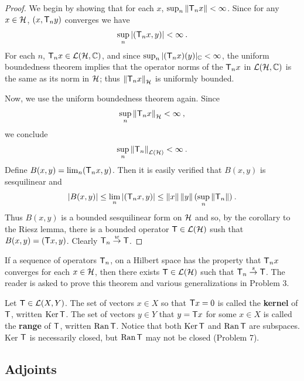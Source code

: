 \begin{proof}
    We begin by showing that for each $x$, $\sup_n \left \Vert \mathsf{T}_n x \right \Vert < \infty$. Since for any $x \in \mathcal{H}$, $(x, \mathsf{T}_n y)$ converges we have \begin{align}
        \sup_n |(\mathsf{T}_n x, y)| < \infty \:.
    \end{align}
    For each $n$, $\mathsf{T}_n x \in \mathcal L(\mathcal{H}, \mathbb{C})$, and since $\sup_n |(\mathsf{T}_n x)(y)|_{\mathbb{C}} < \infty$, the uniform boundedness theorem implies that the operator norms of the $\mathsf{T}_nx$ in $\mathcal L(\mathcal{H}, \mathbb{C})$ is the same as its norm in $\mathcal{H}$; thus $\left \Vert \mathsf{T}_n x \right \Vert_{\mathcal{H}}$ is uniformly bounded.

    Now, we use the uniform boundedness theorem again. Since \begin{align}
        \sup_n \left \Vert \mathsf{T}_n x \right \Vert_{\mathcal{H}} < \infty \:,
    \end{align}
    we conclude \begin{align}
        \sup_n \left \Vert \mathsf{T}_n \right \Vert_{\mathcal L(\mathcal{H})} < \infty \:.
    \end{align}
    Define $B(x,y) = \lim_n (\mathsf{T}_n x, y)$. Then it is easily verified that $B(x,y)$ is sesquilinear and \begin{align}
        |B(x,y)| \leq \lim_n |(\mathsf{T}_n x,y)| \leq \left \Vert x \right \Vert \left \Vert y \right \Vert (\sup_n \left \Vert \mathsf{T}_n \right \Vert) \:.
    \end{align}
    Thus $B(x,y)$ is a bounded sesquilinear form on $\mathcal{H}$ and so, by the corollary to the Riesz lemma, there is a bounded operator $\mathsf{T} \in \mathcal L(\mathcal{H})$ sush that $B(x,y) = (\mathsf{T} x,y)$. Clearly $\mathsf{T}_n \overset{w}\rightarrow \mathsf{T}$.
\end{proof}

If a sequence of operators $\mathsf{T}_n$, on a Hilbert space has the property that $\mathsf{T}_n x$ converges for each $x \in \mathcal{H}$, then there exists $\mathsf{T} \in \mathcal L(\mathcal{H})$ such that $\mathsf{T}_n \overset{s}\rightarrow \mathsf{T}$. The reader is asked to prove this theorem and various generalizations in Problem 3.

Let $\mathsf{T} \in \mathcal L(X,Y)$. The set of vectors $x \in X$ so that $\mathsf{T} x = 0$ is called the \textbf{kernel} of $\mathsf{T}$, written $\mathrm{Ker}\, \mathsf{T}$. The set of vectors $y \in Y$ that $y = \mathsf{T} x$ for some $x \in X$ is called the \textbf{range} of $\mathsf{T}$, written $ \mathrm{Ran}\, \mathsf{T}$. Notice that both $\mathrm{Ker}\, \mathsf{T}$ and $\mathrm{Ran}\, \mathsf{T}$ are subspaces. Ker $\mathsf{T}$ is necessarily closed, but $\mathrm{Ran}\, \mathsf{T}$ may not be closed (Problem 7).

\subsection{Adjoints}